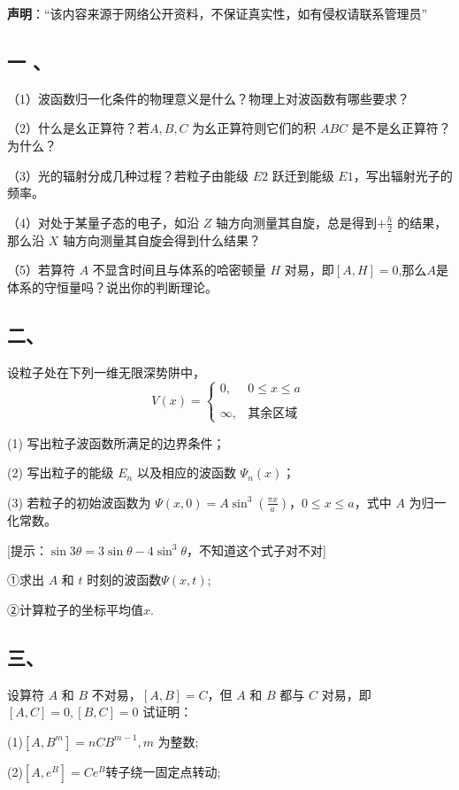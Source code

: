 
\textbf{声明}：“该内容来源于网络公开资料，不保证真实性，如有侵权请联系管理员”

\subsection{一 、}

（1）波函数归一化条件的物理意义是什么？物理上对波函数有哪些要求？

（2）什么是幺正算符？若$ A,B,C$ 为幺正算符则它们的积 $ABC$ 是不是幺正算符？为什么？

（3）光的辐射分成几种过程？若粒子由能级 $E2$ 跃迁到能级 $E1$，写出辐射光子的频率。

（4）对处于某量子态的电子，如沿 $Z$ 轴方向测量其自旋，总是得到$+\frac{h}{2}$
 的结果，那么沿 $X$ 轴方向测量其自旋会得到什么结果？

（5）若算符 $A$ 不显含时间且与体系的哈密顿量 $H$ 对易，即$[A,H]=0$,那么$A$是体系的守恒量吗？说出你的判断理论。
\subsection{二、}
设粒子处在下列一维无限深势阱中，
\[V(x) = \begin{cases} 0, & 0 \leq x \leq a \\\\\infty, & \text{其余区域}\end{cases}~\]

(1) 写出粒子波函数所满足的边界条件；

(2) 写出粒子的能级 $E_n$ 以及相应的波函数 $\Psi_n(x)$；

(3) 若粒子的初始波函数为 $\Psi(x,0) = A\sin^3 \left(\frac{\pi x}{a}\right)$，$0 \leq x \leq a$，式中 $A$ 为归一化常数。

[提示：$\sin 3\theta = 3 \sin \theta - 4 \sin^3 \theta$，不知道这个式子对不对]

①求出 $A$ 和 $t$ 时刻的波函数$\Psi(x,t)$;

②计算粒子的坐标平均值$x$.
\subsection{三、}
设算符 $A$ 和 $B$ 不对易，$[A,B]=C$，但 $A$ 和 $B$ 都与 $C$ 对易，即
$[A,C]=0,[B,C]=0$ 试证明：

(1)$[A, B^m] =n CB^{m-1} ,m$ 为整数;

(2)$[A, e^B] =Ce^B$转子绕一固定点转动;

